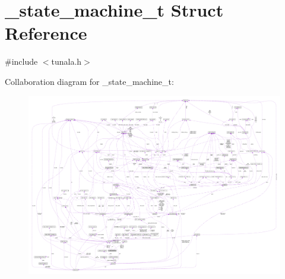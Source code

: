 \hypertarget{struct__state__machine__t}{}\section{\+\_\+state\+\_\+machine\+\_\+t Struct Reference}
\label{struct__state__machine__t}


{\ttfamily \#include $<$tunala.\+h$>$}



Collaboration diagram for \+\_\+state\+\_\+machine\+\_\+t\+:\nopagebreak
\begin{figure}[H]
\begin{center}
\leavevmode
\includegraphics[width=350pt]{struct__state__machine__t__coll__graph}
\end{center}
\end{figure}
